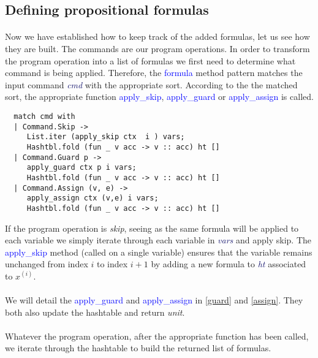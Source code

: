 \documentclass[letterpaper,12pt]{article}
\begin{document}
\subsection{Defining propositional formulas}
\paragraph{}
Now we have established how to keep track of the added formulas, let us see how they are built.
The commands are our program operations. In order to transform the program operation into a list of formulas we first need to determine what command is being applied.
Therefore, the \textcolor{blue}{formula} method pattern matches the input command \textit{\textcolor{MidnightBlue}{cmd}} with the appropriate sort. According to the the matched sort, the appropriate function \textcolor{blue}{apply\_skip}, \textcolor{blue}{apply\_guard} or \textcolor{blue}{apply\_assign} is called. 

\begin{verbatim}
  match cmd with
  | Command.Skip ->
     List.iter (apply_skip ctx  i ) vars;
     Hashtbl.fold (fun _ v acc -> v :: acc) ht []
  | Command.Guard p ->
     apply_guard ctx p i vars;
     Hashtbl.fold (fun _ v acc -> v :: acc) ht []
  | Command.Assign (v, e) ->
     apply_assign ctx (v,e) i vars;
     Hashtbl.fold (fun _ v acc -> v :: acc) ht []
\end{verbatim}

If the program operation is \textit{skip}, seeing as the same formula will be applied to each variable we simply iterate through each variable in \textit{\textcolor{MidnightBlue}{vars}} and apply skip. The \textcolor{blue}{apply\_skip} method (called on a single variable) ensures that the variable remains unchanged from index $i$ to index $i+1$ by adding a new formula to \textit{\textcolor{MidnightBlue}{ht}} associated to $x^{(i)}$.

\paragraph{}
We will detail the \textcolor{blue}{apply\_guard} and \textcolor{blue}{apply\_assign} in \ref{guard} and \ref{assign}.
They both also update the hashtable and return \textit{unit}.
\paragraph{}
Whatever the program operation, after the appropriate function has been called, we iterate through the hashtable to build the returned list of formulas.
\end{document}
